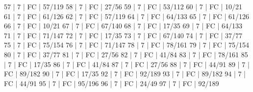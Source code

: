 57    |  7     |    FC                                        | 57/119   
58    |  7     |    FC                                        | 27/56   
59    |  7     |    FC                                        | 53/112   
60    |  7     |    FC                                        | 10/21   
61    |  7     |    FC                                        | 61/126   
62    |  7     |    FC                                        | 57/119   
64    |  7     |    FC                                        | 64/133   
65    |  7     |    FC                                        | 61/126   
66    |  7     |    FC                                        | 10/21   
67    |  7     |    FC                                        | 67/140   
68    |  7     |    FC                                        | 17/35   
69    |  7     |    FC                                        | 64/133   
71    |  7     |    FC                                        | 71/147   
72    |  7     |    FC                                        | 17/35   
73    |  7     |    FC                                        | 67/140   
74    |  7     |    FC                                        | 37/77   
75    |  7     |    FC                                        | 75/154   
76    |  7     |    FC                                        | 71/147   
78    |  7     |    FC                                        | 78/161   
79    |  7     |    FC                                        | 75/154   
80    |  7     |    FC                                        | 37/77   
81    |  7     |    FC                                        | 27/56   
82    |  7     |    FC                                        | 41/84   
83    |  7     |    FC                                        | 78/161   
85    |  7     |    FC                                        | 17/35   
86    |  7     |    FC                                        | 41/84   
87    |  7     |    FC                                        | 27/56   
88    |  7     |    FC                                        | 44/91   
89    |  7     |    FC                                        | 89/182   
90    |  7     |    FC                                        | 17/35   
92    |  7     |    FC                                        | 92/189   
93    |  7     |    FC                                        | 89/182   
94    |  7     |    FC                                        | 44/91   
95    |  7     |    FC                                        | 95/196   
96    |  7     |    FC                                        | 24/49   
97    |  7     |    FC                                        | 92/189   
